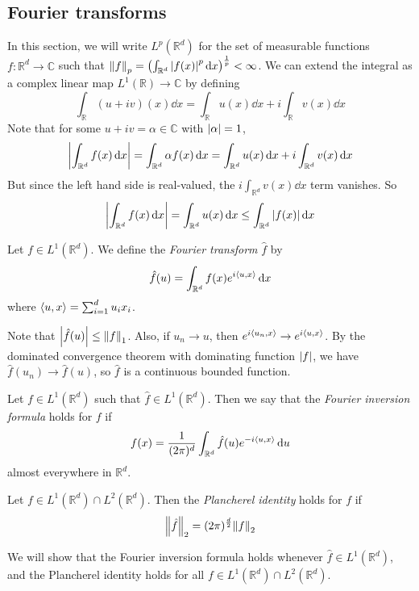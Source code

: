 \subsection{Fourier transforms}
In this section, we will write \( L^p(\mathbb R^d) \) for the set of measurable functions \( f \colon \mathbb R^d \to \mathbb C \) such that \( \norm{f}_p = \qty(\int_{\mathbb R^d} \abs{f(x)}^p \dd{x})^{\frac 1p} < \infty \).
We can extend the integral as a complex linear map \( L^1(\mathbb R) \to \mathbb C \) by defining
\[ \int_{\mathbb R} (u + iv)(x) \dd{x} = \int_{\mathbb R} u(x) \dd{x} + i \int_{\mathbb R} v(x) \dd{x} \]
Note that for some \( u + iv = \alpha \in \mathbb C \) with \( \abs{\alpha} = 1 \),
\[ \abs{\int_{\mathbb R^d} f(x) \dd{x}} = \int_{\mathbb R^d} \alpha f(x) \dd{x} = \int_{\mathbb R^d} u(x) \dd{x} + i \int_{\mathbb R^d} v(x) \dd{x} \]
But since the left hand side is real-valued, the \( i \int_{\mathbb R^d} v(x) \dd{x} \) term vanishes.
So
\[ \abs{\int_{\mathbb R^d} f(x) \dd{x}} = \int_{\mathbb R^d} u(x) \dd{x} \leq \int_{\mathbb R^d} \abs{f(x)} \dd{x} \]
\begin{definition}
	Let \( f \in L^1(\mathbb R^d) \).
	We define the \emph{Fourier transform} \( \hat f \) by
	\[ \hat f(u) = \int_{\mathbb R^d} f(x) e^{i\left\langle{u,x}\right\rangle} \dd{x} \]
	where \( \left\langle{u,x}\right\rangle = \sum_{i=1}^d u_i x_i \).
\end{definition}
\begin{remark}
	Note that \( \abs{\hat f(u)} \leq \norm{f}_1 \).
	Also, if \( u_n \to u \), then \( e^{i\left\langle{u_n,x}\right\rangle} \to e^{i\left\langle{u,x}\right\rangle} \).
	By the dominated convergence theorem with dominating function \( \abs{f} \), we have \( \hat f(u_n) \to \hat f(u) \), so \( \hat f \) is a continuous bounded function.
\end{remark}
\begin{definition}
	Let \( f \in L^1(\mathbb R^d) \) such that \( \hat f \in L^1(\mathbb R^d) \).
	Then we say that the \emph{Fourier inversion formula} holds for \( f \) if
	\[ f(x) = \frac{1}{(2\pi)^d} \int_{\mathbb R^d} \hat f(u) e^{-i\left\langle{u,x}\right\rangle} \dd{u} \]
	almost everywhere in \( \mathbb R^d \).
\end{definition}
\begin{definition}
	Let \( f \in L^1(\mathbb R^d) \cap L^2(\mathbb R^d) \).
	Then the \emph{Plancherel identity} holds for \( f \) if
	\[ \norm{\hat f}_2 = (2\pi)^{\frac d2} \norm{f}_2 \]
\end{definition}
We will show that the Fourier inversion formula holds whenever \( \hat f \in L^1(\mathbb R^d) \), and the Plancherel identity holds for all \( f \in L^1(\mathbb R^d) \cap L^2(\mathbb R^d) \).
